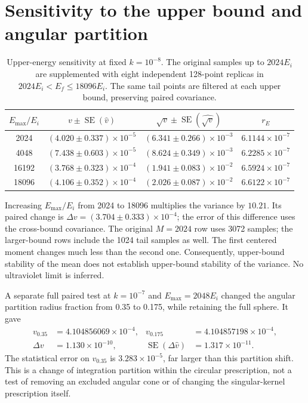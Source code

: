 \documentclass[10pt,a4paper]{article}
\newcommand{\SE}{\operatorname{SE}}
\begin{document}
\section{Sensitivity to the upper bound and angular partition}
\begin{table}[h!]
\centering\small
\caption{Upper-energy sensitivity at fixed $k=10^{-8}$. The original
samples up to $2024E_i$ are supplemented with eight independent
128-point replicas in $2024E_i<E_f\le18096E_i$. The same tail points
are filtered at each upper bound, preserving paired covariance.}
\begin{tabular}{cccc}
\toprule
$E_{\max}/E_i$ & $v\pm\SE(\widehat v)$ &
$\sqrt v\pm\SE(\widehat{\sqrt v})$ & $r_E$\\
\midrule
2024 & $(4.020\pm0.337)\times10^{-5}$ & $(6.341\pm0.266)\times10^{-3}$ & $6.1144\times10^{-7}$\\
4048 & $(7.438\pm0.603)\times10^{-5}$ & $(8.624\pm0.349)\times10^{-3}$ & $6.2285\times10^{-7}$\\
16192 & $(3.768\pm0.323)\times10^{-4}$ & $(1.941\pm0.083)\times10^{-2}$ & $6.5924\times10^{-7}$\\
18096 & $(4.106\pm0.352)\times10^{-4}$ & $(2.026\pm0.087)\times10^{-2}$ & $6.6122\times10^{-7}$\\
\bottomrule
\end{tabular}
\end{table}

Increasing $E_{\max}/E_i$ from 2024 to 18096 multiplies the variance by
$10.21$. Its paired change is
$\Delta v=(3.704\pm0.333)\times10^{-4}$; the error of this difference uses the
cross-bound covariance. The original $M=2024$ row uses 3072 samples;
the larger-bound rows include the 1024 tail samples as well.
The first centered moment changes much less than the second one.
Consequently, upper-bound stability of the mean does not establish
upper-bound stability of the variance. No ultraviolet limit is inferred.

A separate full paired test at $k=10^{-7}$ and $E_{\max}=2048E_i$
changed the angular partition radius fraction from 0.35 to 0.175,
while retaining the full sphere. It gave
\begin{align*}
 v_{0.35}&=4.104856069\times10^{-4}, &
 v_{0.175}&=4.104857198\times10^{-4},\\
 \Delta v&=1.130\times10^{-10}, &
 \SE(\Delta\widehat v)&=1.317\times10^{-11}.
\end{align*}
The statistical error on $v_{0.35}$ is $3.283\times10^{-5}$, far larger
than this partition shift. This is a change of integration partition
within the circular prescription, not a test of removing an excluded
angular cone or of changing the singular-kernel prescription itself.
\end{document}
